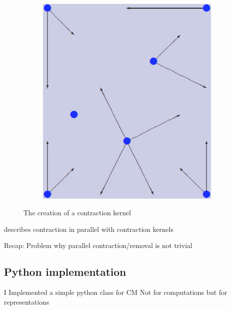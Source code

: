 \documentclass[12pt]{article}
\begin{document}
\begin{figure}[tb]
\begin{subfigure}[b]{0.2\textwidth}
      \caption{}\label{fig:contract_kernel7}
  \end{subfigure}
  ~
  \begin{subfigure}[b]{0.2\textwidth}
      \includegraphics[width=\textwidth]{img/contract_kernel8}
      \caption{}
      \label{fig:contract_kernel8}
  \end{subfigure}

  \caption{The creation of a contraction kernel}
  \label{fig:creationg_of_a_kernel}
\end{figure}

\cite{brun2003contraction} describes contraction in parallel with
contraction kernels

Recap: Problem why parallel
contraction/removal is not trivial


\subsection{Python implementation} %
\label{sub:python_implementation}

I Implemented a simple python class for CM
Not for computations but for representations
\end{document}
